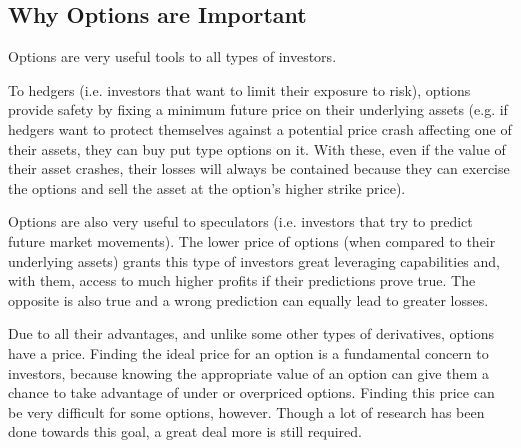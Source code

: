\subsection{Why Options are Important}
\label{subsection:why options are important}
Options are very useful tools to all types of investors. 

To hedgers (i.e. investors that want to limit their exposure to risk), options provide safety by fixing a minimum future price on their underlying assets (e.g. if hedgers want to protect themselves against a potential price crash affecting one of their assets, they can buy put type options on it. With these, even if the value of their asset crashes, their losses will always be contained because they can exercise the options and sell the asset at the option's higher strike price).

Options are also very useful to speculators (i.e. investors that try to predict future market movements). The lower price of options (when compared to their underlying assets) grants this type of investors great leveraging capabilities and, with them, access to much higher profits if their predictions prove true. The opposite is also true and a wrong prediction can equally lead to greater losses.

Due to all their advantages, and unlike some other types of derivatives, options have a price. Finding the ideal price for an option is a fundamental concern to investors, because knowing the appropriate value of an option can give them a chance to take advantage of under or overpriced options.
Finding this price can be very difficult for some options, however. Though a lot of research has been done towards this goal, a great deal more is still required.

